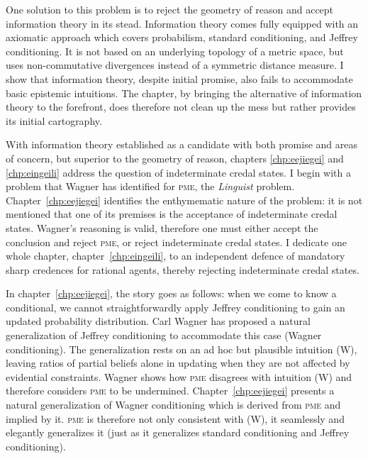 \documentclass[phd,12pt,oneside]{ubcthesis}
\begin{document}
One solution to this problem is to reject the geometry of reason and
accept information theory in its stead. Information theory comes fully
equipped with an axiomatic approach which covers probabilism, standard
conditioning, and Jeffrey conditioning. It is not based on an
underlying topology of a metric space, but uses non-commutative
divergences instead of a symmetric distance measure. I show that
information theory, despite initial promise, also fails to accommodate
basic epistemic intuitions. The chapter, by bringing the alternative
of information theory to the forefront, does therefore not clean up
the mess but rather provides its initial cartography.

With information theory established as a candidate with both promise
and areas of concern, but superior to the geometry of reason, chapters
\ref{chp:eejiegei} and \ref{chp:eingeili} address the question of
indeterminate credal states. I begin with a problem that Wagner has
identified for \textsc{pme}, the \emph{Linguist} problem.
Chapter~\ref{chp:eejiegei} identifies the enthymematic nature of the
problem: it is not mentioned that one of its premises is the
acceptance of indeterminate credal states. Wagner's reasoning is
valid, therefore one must either accept the conclusion and reject
\textsc{pme}, or reject indeterminate credal states. I dedicate one
whole chapter, chapter~\ref{chp:eingeili}, to an independent defence
of mandatory sharp credences for rational agents, thereby rejecting
indeterminate credal states.

In chapter~\ref{chp:eejiegei}, the story goes as follows: when we come
to know a conditional, we cannot straightforwardly apply Jeffrey
conditioning to gain an updated probability distribution. Carl Wagner
has proposed a natural generalization of Jeffrey conditioning to
accommodate this case (Wagner conditioning). The generalization rests
on an ad hoc but plausible intuition (W), leaving ratios of partial
beliefs alone in updating when they are not affected by evidential
constraints. Wagner shows how \textsc{pme} disagrees with intuition
(W) and therefore considers \textsc{pme} to be undermined.
Chapter~\ref{chp:eejiegei} presents a natural generalization of Wagner
conditioning which is derived from \textsc{pme} and implied by it.
\textsc{pme} is therefore not only consistent with (W), it seamlessly
and elegantly generalizes it (just as it generalizes standard
conditioning and Jeffrey conditioning).
\end{document}
